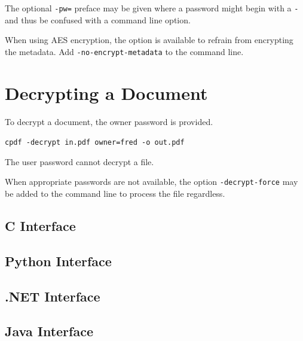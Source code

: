 \documentclass{book}
\begin{document}
The optional \texttt{-pw=} preface may be given where a password might begin with a \texttt{-} and thus be confused with a command line option.

When using AES encryption, the option is available to refrain from encrypting the
metadata. Add \texttt{-no-encrypt-metadata} to the command line.

  \section{Decrypting a Document}
  To decrypt a document, the owner password is provided.
  \begin{framed}
    \noindent\small\verb!cpdf -decrypt in.pdf owner=fred -o out.pdf!
  \end{framed}
  \noindent The user password cannot decrypt a file.

When appropriate passwords are not available, the option \texttt{-decrypt-force} may be added to the command line to process the file regardless.


\begin{cpdflib}
\clearpage
\section*{C Interface}
\begin{small}\tt

\end{small}
\end{cpdflib}

\begin{pycpdflib}
\clearpage
\section*{Python Interface}
\begin{small}\tt

\end{small}
\end{pycpdflib}

\begin{dotnetcpdflib}
\clearpage
\section*{.NET Interface}
\begin{small}\tt

\end{small}
\end{dotnetcpdflib}

\begin{jcpdflib}
\clearpage
\section*{Java Interface}
\begin{small}\tt

\end{small}
\end{jcpdflib}
\end{document}
